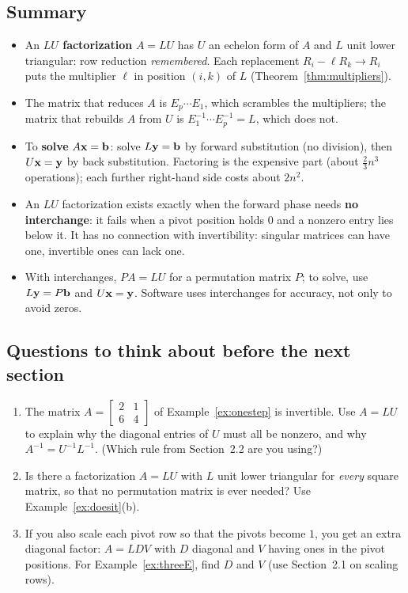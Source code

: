 \documentclass[11pt]{article}
\begin{document}
\subsection*{Summary}
\begin{itemize}
  \item An \textbf{$LU$ factorization} $A=LU$ has $U$ an echelon form of $A$ and $L$ unit lower triangular: row reduction \emph{remembered}. Each replacement $R_i-\ell R_k\to R_i$ puts the multiplier $\ell$ in position $(i,k)$ of $L$ (Theorem~\ref{thm:multipliers}).
  \item The matrix that reduces $A$ is $E_p\cdots E_1$, which scrambles the multipliers; the matrix that rebuilds $A$ from $U$ is $E_1^{-1}\cdots E_p^{-1}=L$, which does not.
  \item To \textbf{solve} $A\mathbf{x}=\mathbf{b}$: solve $L\mathbf{y}=\mathbf{b}$ by forward substitution (no division), then $U\mathbf{x}=\mathbf{y}$ by back substitution. Factoring is the expensive part (about $\tfrac23n^3$ operations); each further right-hand side costs about $2n^2$.
  \item An $LU$ factorization exists exactly when the forward phase needs \textbf{no interchange}: it fails when a pivot position holds $0$ and a nonzero entry lies below it. It has no connection with invertibility: singular matrices can have one, invertible ones can lack one.
  \item With interchanges, $PA=LU$ for a permutation matrix $P$; to solve, use $L\mathbf{y}=P\mathbf{b}$ and $U\mathbf{x}=\mathbf{y}$. Software uses interchanges for accuracy, not only to avoid zeros.
\end{itemize}

\subsection*{Questions to think about before the next section}
\begin{enumerate}
  \item The matrix $A=\begin{bmatrix}2&1\\6&4\end{bmatrix}$ of Example~\ref{ex:onestep} is invertible. Use $A=LU$ to explain why the diagonal entries of $U$ must all be nonzero, and why $A^{-1}=U^{-1}L^{-1}$. (Which rule from Section~2.2 are you using?)
  \item Is there a factorization $A=LU$ with $L$ unit lower triangular for \emph{every} square matrix, so that no permutation matrix is ever needed? Use Example~\ref{ex:doesit}(b).
  \item If you also scale each pivot row so that the pivots become $1$, you get an extra diagonal factor: $A=LDV$ with $D$ diagonal and $V$ having ones in the pivot positions. For Example~\ref{ex:threeE}, find $D$ and $V$ (use Section~2.1 on scaling rows).
\end{enumerate}
\end{document}
